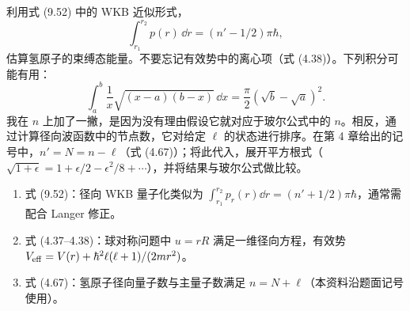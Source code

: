 \begin{question}
利用式 (9.52) 中的 WKB 近似形式，
\[
\int_{r_1}^{r_2}p(r)\,\dd r=(n'-1/2)\pi\hbar,
\]
估算氢原子的束缚态能量。不要忘记有效势中的离心项（式 (4.38)）。下列积分可能有用：
\[
\int_a^b\frac{1}{x}\sqrt{(x-a)(b-x)}\,\dd x=\frac{\pi}{2}(\sqrt b-\sqrt a)^2.
\]
我在 $n$ 上加了一撇，是因为没有理由假设它就对应于玻尔公式中的 $n$。相反，通过计算径向波函数中的节点数，它对给定 $\ell$ 的状态进行排序。在第 4 章给出的记号中，$n'=N=n-\ell$（式 (4.67)）；将此代入，展开平方根式（$\sqrt{1+\epsilon}=1+\epsilon/2-\epsilon^2/8+\cdots$），并将结果与玻尔公式做比较。

\par\smallskip
{}
\begin{enumerate}[leftmargin=2.2em,itemsep=0.12em,topsep=0.12em,parsep=0pt]
\item 式 (9.52)：径向 WKB 量子化类似为 $\int_{r_1}^{r_2}p_r(r)\dd r=(n'+1/2)\pi\hbar$，通常需配合 Langer 修正。
\item 式 (4.37--4.38)：球对称问题中 $u=rR$ 满足一维径向方程，有效势 $V_{\rm eff}=V(r)+\hbar^2\ell(\ell+1)/(2mr^2)$。
\item 式 (4.67)：氢原子径向量子数与主量子数满足 $n=N+\ell$（本资料沿题面记号使用）。
\end{enumerate}

\end{question}
